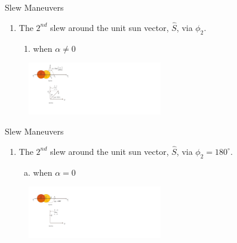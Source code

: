 \documentclass{beamer}
\begin{document}
\begin{frame}
\begin{block}{Slew Maneuvers}
\begin{enumerate}[2]
\item The $2^{nd}$ slew around the unit sun vector, $\hat{S}$, via $\phi_2$.
\begin{enumerate}[a]
\item when $\alpha\neq0$
\end{enumerate}
\end{enumerate}
\begin{figure}
\includegraphics[width=2.3in]{./Figures/SVAS_2r}
\end{figure}
\end{block}
\end{frame}
\begin{frame}
\begin{block}{Slew Maneuvers}
\begin{enumerate}[2]
\item The $2^{nd}$ slew around the unit sun vector, $\hat{S}$, via $\phi_2=180^{\circ}$.
\begin{enumerate}[b)]
\item when $\alpha=0$
\end{enumerate}
\end{enumerate}
\begin{figure}
\includegraphics[width=2.3in]{./Figures/SVAS_3r}
\end{figure}
\end{block}
\end{frame}
\end{document}

